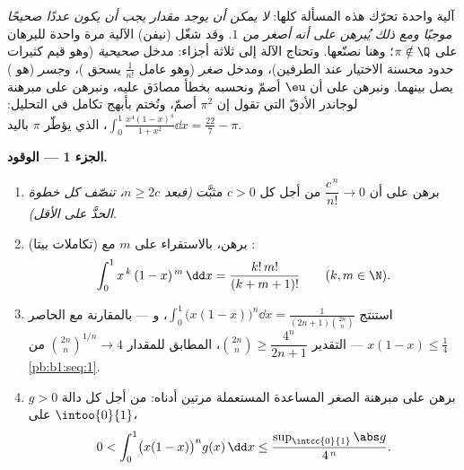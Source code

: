 \begin{problem}
\label{pb:b1:integration:1}
آلية واحدة تحرّك هذه المسألة كلها: \emph{لا يمكن أن يوجد مقدار
يجب أن يكون عددًا صحيحًا موجبًا ومع ذلك يُبرهن على أنه أصغر من $1$}.
وقد شغّل  (نيفن) الآلية مرة واحدة
للبرهان على $\pi \notin \Q$؛ وهنا نصنّعها. وتحتاج الآلة
إلى ثلاثة أجزاء: مدخل \emph{صحيحية} (وهو قيم كثيرات
حدود محسنة الاختيار عند الطرفين)، ومدخل \emph{صغر} (وهو عامل
$\frac{1}{n!}$ يسحق )، و\emph{جسر}
(هو ) يصل بينهما. ونبرهن على أن $\eu$
أصمّ ونحسبه بخطأ مصادَق عليه، ونبرهن على مبرهنة لوجاندر
الأدقّ التي تقول إن $\pi^2$ أصمّ، ونُختم بأبهج
تكامل في التحليل: $\int_0^1 \frac{x^4(1 -
x)^4}{1 + x^2}\dd x = \frac{22}{7} - \pi$، الذي يؤطّر $\pi$
باليد.

\medskip
\noindent\textbf{الجزء 1 --- الوقود.}
\begin{enumerate}
  \item برهن على أن $\dfrac{c^{\,n}}{n!} \to 0$ من أجل كل $c
        > 0$ مثبَّت \emph{(فبعد $n \geq 2c$، تنصّف كل خطوة الحدَّ
        على الأقل)}.
  \item (تكاملات بيتا) برهن، بالاستقراء على $m$ مع
        :
        \[
        \int_0^1 x^{\,k}\,(1 - x)^{\,m}\,\dd x =
        \frac{k!\,m!}{(k + m + 1)!}
        \qquad (k, m \in \N).
        \]
  \item استنتج $\displaystyle\int_0^1 \bigl(x(1-x)\bigr)^n \dd x
        = \frac{1}{(2n+1)\binom{2n}{n}}$، و --- بالمقارنة مع
        الحاصر $x(1 - x) \leq \frac14$ --- التقدير
        $\binom{2n}{n} \geq \dfrac{4^n}{2n+1}$، المطابق
        للمقدار $\binom{2n}{n}^{1/n} \to 4$ من \cref{pb:b1:seq:1}.
  \item برهن على مبرهنة الصغر المساعدة المستعملة مرتين أدناه: من أجل كل
        دالة  $g > 0$ على $\intoo{0}{1}$،
        \[
        0 < \int_0^1 \bigl(x(1-x)\bigr)^n g(x)\,\dd x
        \leq \frac{\sup_{\intcc{0}{1}}\abs g}{4^{\,n}} .
        \]
\end{enumerate}


\end{problem}
